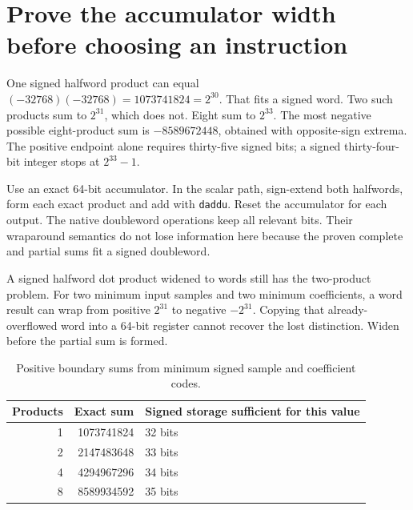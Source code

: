 \section{Prove the accumulator width before choosing an instruction}
One signed halfword product can equal
\((-32768)(-32768)=1073741824=2^{30}\). That fits a signed word. Two such products
sum to \(2^{31}\), which does not. Eight sum to \(2^{33}\). The most negative
possible eight-product sum is \(-8589672448\), obtained with opposite-sign extrema.
The positive endpoint alone requires thirty-five signed bits; a signed thirty-four-bit
integer stops at \(2^{33}-1\).

Use an exact 64-bit accumulator. In the scalar path, sign-extend both halfwords,
form each exact product and add with \texttt{daddu}. Reset the accumulator for each
output. The native doubleword operations keep all relevant bits. Their wraparound
semantics do not lose information here because the proven complete and partial sums
fit a signed doubleword.

A signed halfword dot product widened to words still has the two-product problem.
For two minimum input samples and two minimum coefficients, a word result can wrap
from positive \(2^{31}\) to negative \(-2^{31}\). Copying that already-overflowed
word into a 64-bit register cannot recover the lost distinction. Widen before the
partial sum is formed.

\begin{table}[htbp]
\centering
\caption{Positive boundary sums from minimum signed sample and coefficient codes.}
\begin{tabular}{rrl}
\toprule
Products & Exact sum & Signed storage sufficient for this value\\
\midrule
1 & 1073741824 & 32 bits\\
2 & 2147483648 & 33 bits\\
4 & 4294967296 & 34 bits\\
8 & 8589934592 & 35 bits\\
\bottomrule
\end{tabular}
\end{table}
